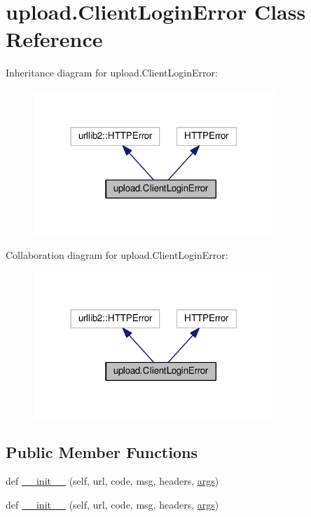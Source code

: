 \hypertarget{classupload_1_1ClientLoginError}{}\section{upload.\+Client\+Login\+Error Class Reference}
\label{classupload_1_1ClientLoginError}


Inheritance diagram for upload.\+Client\+Login\+Error\+:\nopagebreak
\begin{figure}[H]
\begin{center}
\leavevmode
\includegraphics[width=258pt]{classupload_1_1ClientLoginError__inherit__graph}
\end{center}
\end{figure}


Collaboration diagram for upload.\+Client\+Login\+Error\+:\nopagebreak
\begin{figure}[H]
\begin{center}
\leavevmode
\includegraphics[width=258pt]{classupload_1_1ClientLoginError__coll__graph}
\end{center}
\end{figure}
\subsection*{Public Member Functions}
\begin{DoxyCompactItemize}
\item 
def \hyperlink{classupload_1_1ClientLoginError_a1e590616c2976d881e155958cedbbe47}{\+\_\+\+\_\+init\+\_\+\+\_\+} (self, url, code, msg, headers, \hyperlink{classupload_1_1ClientLoginError_ac300a0b034b2bc64cedc51e09fb6d663}{args})
\item 
def \hyperlink{classupload_1_1ClientLoginError_a1e590616c2976d881e155958cedbbe47}{\+\_\+\+\_\+init\+\_\+\+\_\+} (self, url, code, msg, headers, \hyperlink{classupload_1_1ClientLoginError_ac300a0b034b2bc64cedc51e09fb6d663}{args})
\end{DoxyCompactItemize}
